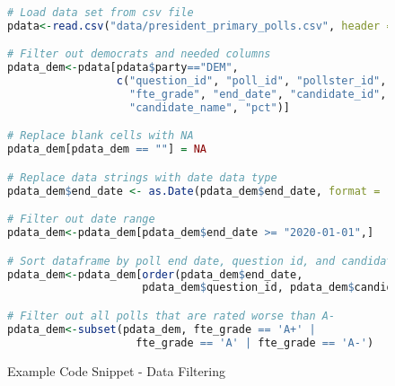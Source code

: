 \begin{figure}[H]
\centering
\begin{lstlisting}[language=R]
# Load data set from csv file
pdata<-read.csv("data/president_primary_polls.csv", header = TRUE)

# Filter out democrats and needed columns
pdata_dem<-pdata[pdata$party=="DEM", 
                 c("question_id", "poll_id", "pollster_id", 
                   "fte_grade", "end_date", "candidate_id", 
                   "candidate_name", "pct")]

# Replace blank cells with NA
pdata_dem[pdata_dem == ""] = NA

# Replace data strings with date data type
pdata_dem$end_date <- as.Date(pdata_dem$end_date, format = "%m/%d/%y")

# Filter out date range
pdata_dem<-pdata_dem[pdata_dem$end_date >= "2020-01-01",]

# Sort dataframe by poll end date, question id, and candidate id
pdata_dem<-pdata_dem[order(pdata_dem$end_date, 
                     pdata_dem$question_id, pdata_dem$candidate_id),]

# Filter out all polls that are rated worse than A-
pdata_dem<-subset(pdata_dem, fte_grade == 'A+' | 
                    fte_grade == 'A' | fte_grade == 'A-')
\end{lstlisting}
\caption{Example Code Snippet - Data Filtering}
\label{code:filter}
\end{figure}
